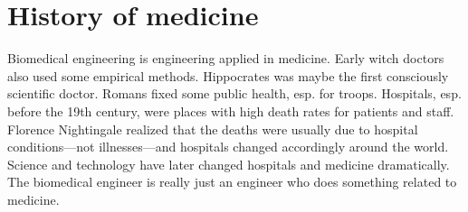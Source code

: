 \section{History of medicine}
Biomedical engineering is engineering applied in medicine. Early witch doctors also used some empirical methods. Hippocrates was maybe the first consciously scientific doctor. Romans fixed some public health, esp. for troops. Hospitals, esp. before the 19th century, were places with high death rates for patients and staff. Florence Nightingale realized that the deaths were usually due to hospital conditions---not illnesses---and hospitals changed accordingly around the world. Science and technology have later changed hospitals and medicine dramatically. The biomedical engineer is really just an engineer who does something related to medicine.
